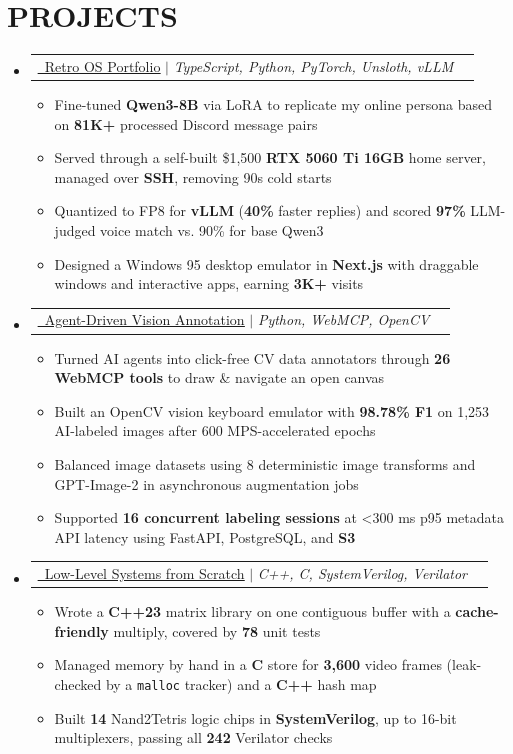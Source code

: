 \documentclass[letterpaper,11pt]{article}
\makeatletter
\newcommand{\resumeItem}[1]{
  \item\small{
    {#1 \vspace{-4pt}}
  }
}
\newcommand{\resumeProjectHeading}[2]{
    \item
    \begin{tabular*}{0.97\textwidth}[t]{l@{\extracolsep{\fill}}r}
      #1 & #2 \\
    \end{tabular*}\vspace{-7pt}
}
\newcommand{\resumeSubHeadingListStart}{\begin{itemize}[leftmargin=0.15in, label={}]}
\newcommand{\resumeSubHeadingListEnd}{\end{itemize}}
\newcommand{\resumeItemListStart}{\begin{itemize}[itemsep=4.5pt]}
\newcommand{\resumeItemListEnd}{\end{itemize}\vspace{-6pt}}
\newcommand{\vercelLogo}{\raisebox{0.02em}{\scalebox{1.43}[1.148]{$\blacktriangle$}}}
\makeatother
\begin{document}
\section{\textbf{PROJECTS}}
    \resumeSubHeadingListStart
    \resumeProjectHeading
  {\href{https://advm.dev/}{\textcolor{linkblue}{\underline{\vercelLogo\ Retro OS Portfolio}}}
  $|$
  \emph{TypeScript, Python, PyTorch, Unsloth, vLLM}
  }{}
  \resumeItemListStart
    \resumeItem{Fine-tuned \textbf{Qwen3-8B} via LoRA to replicate my online persona based on \textbf{81K+} processed Discord message pairs}
    \resumeItem{Served through a self-built \$1,500 \textbf{RTX 5060 Ti 16GB} home server, managed over \textbf{SSH}, removing 90s cold starts}
    \resumeItem{Quantized to FP8 for \textbf{vLLM} (\textbf{40\%} faster replies) and scored \textbf{97\%} LLM-judged voice match vs. 90\% for base Qwen3}
    \resumeItem{Designed a Windows 95 desktop emulator in \textbf{Next.js} with draggable windows and interactive apps, earning \textbf{3K+} visits}
  \resumeItemListEnd
    \resumeProjectHeading
  {\href{https://github.com/0xABAN/YADL}{\textcolor{linkblue}{\underline{\faGithub\ Agent-Driven Vision Annotation}}}
  $|$
  \emph{Python, WebMCP, OpenCV}
  }
  {}
  \resumeItemListStart
    \resumeItem{Turned AI agents into click-free CV data annotators through \textbf{26 WebMCP tools} to draw \& navigate an open canvas}
    \resumeItem{Built an OpenCV vision keyboard emulator with \textbf{98.78\% F1} on 1,253 AI-labeled images after 600 MPS-accelerated epochs}
    \resumeItem{Balanced image datasets using 8 deterministic image transforms and GPT-Image-2 in asynchronous augmentation jobs}
    \resumeItem{Supported \textbf{16 concurrent labeling sessions} at \textless{}300 ms p95 metadata API latency using FastAPI, PostgreSQL, and \textbf{S3}}
  \resumeItemListEnd
    \resumeProjectHeading
  {\href{https://github.com/0xABAN/learning}{\textcolor{linkblue}{\underline{\faGithub\ Low-Level Systems from Scratch}}}
  $|$
  \emph{C++, C, SystemVerilog, Verilator}
  }
  {}
  \resumeItemListStart
    \resumeItem{Wrote a \textbf{C++23} matrix library on one contiguous buffer with a \textbf{cache-friendly} multiply, covered by \textbf{78} unit tests}
    \resumeItem{Managed memory by hand in a \textbf{C} store for \textbf{3,600} video frames (leak-checked by a \texttt{malloc} tracker) and a \textbf{C++} hash map}
    \resumeItem{Built \textbf{14} Nand2Tetris logic chips in \textbf{SystemVerilog}, up to 16-bit multiplexers, passing all \textbf{242} Verilator checks}
  \resumeItemListEnd
    \resumeSubHeadingListEnd
\end{document}
